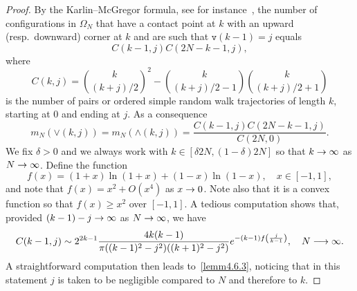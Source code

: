 \documentclass[10pt]{amsart}
\theoremstyle{definition}\newtheorem{defi}[theo]{Definition}\newtheorem{rema}[theo]{Remark}\newtheorem{exam}[theo]{Example}\newtheorem{exem}[theo]{Example}\newtheorem{nota}[theo]{Notation}
\newcommand{\Wedge}{\wedge}\newcommand{\Vee}{\vee}
\theoremstyle{plain}
\newcommand{\ttv}{\mathtt{v}}
\let\originalleft\left
\let\originalright\right
\renewcommand{\left}{\mathopen{}\mathclose\bgroup\originalleft}
\renewcommand{\right}{\aftergroup\egroup\originalright}
\renewcommand*{\to}{\mathchoice{\longrightarrow}{\rightarrow}{\rightarrow}{\rightarrow}}
\begin{document}
\begin{proof}
By the Karlin--McGregor formula, see for instance~\cite[Theorem~2.5]{gorin2021lectures}, the number of configurations in $\Omega_N$ that have a contact point at $k$ with an upward (resp.~downward) corner at $k$ and are such that $\ttv(k-1)=j$ equals
\begin{equation}
C(k-1,j)C(2N-k-1,j),
\end{equation}
where
\begin{equation}
C(k,j)=\binom{k}{(k+j)/2}^2-\binom{k}{(k+j)/2-1}\binom{k}{(k+j)/2+1}
\end{equation}
is the number of pairs or ordered simple random walk trajectories of length $k$, starting at $0$ and ending at $j$. As a consequence
\begin{equation}\label{eq:KmG}
m_{N}(\Vee(k,j)) = m_{N}(\Wedge(k,j)) = \frac{C(k-1,j)C(2N-k-1,j)}{C(2N,0)}.
\end{equation}
We fix $\delta > 0$ and we always work with $k\in [\delta 2N, (1 - \delta) 2N]$ so that $k\to\infty$ as $N\to\infty$. Define the function
\[
f(x) = (1+x) \ln(1+x) + (1-x)\ln (1-x),\quad x\in [-1,1],
\]
and note that $f(x) = x^2 + O(x^4)$ as $x\to 0$. Note also that it is a convex function so that $f(x) \ge x^2$ over $[-1,1]$. A tedious computation shows that, provided $(k-1) - j \to \infty$ as $N\to\infty$, we have
\[
C(k-1,j) \sim 2^{2k-1} \frac{4k(k-1)}{\pi ((k-1)^2-j^2)((k+1)^2-j^2)} e^{-(k-1) f\left(\frac{j}{k-1}\right)},\quad N\to\infty.
\]
A straightforward computation then leads to~\eqref{lemm4.6.3}, noticing that in this statement $j$ is taken to be negligible compared to $N$ and therefore to $k$.


\end{proof}
\end{document}
